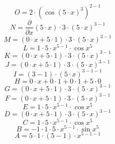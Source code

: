\documentclass[12pt]{article}
\begin{document}
\begin{equation}
	O = 
2\cdot \left( \cos {\left( 5\cdot x\right) ^{3}}\right) ^{2 - 1}
\end{equation}
\begin{equation}
	N = 
\frac{\partial}{\partial x}\left( 5\cdot x\right) \cdot 3\cdot \left( 5\cdot x\right) ^{3 - 1}
\end{equation}
\begin{equation}
	M = 
\left( 0\cdot x + 5\cdot 1\right) \cdot 3\cdot \left( 5\cdot x\right) ^{3 - 1}
\end{equation}
\begin{equation}
	L = 
1\cdot 5\cdot x^{5 - 1}\cdot \cos {x^{5}}
\end{equation}
\begin{equation}
	K = 
\left( 0\cdot x + 5\cdot 1\right) \cdot 3\cdot \left( 5\cdot x\right) ^{3 - 1}
\end{equation}
\begin{equation}
	J = 
\left( 0\cdot x + 5\cdot 1\right) \cdot 3\cdot \left( 5\cdot x\right) ^{3 - 1}
\end{equation}
\begin{equation}
	I = 
\left( 3 - 1\right) \cdot \left( 5\cdot x\right) ^{3 - 1 - 1}
\end{equation}
\begin{equation}
	H = 
0\cdot x + 0\cdot 1 + 0\cdot 1 + 5\cdot 0
\end{equation}
\begin{equation}
	G = 
\left( 0\cdot x + 5\cdot 1\right) \cdot 3\cdot \left( 5\cdot x\right) ^{3 - 1}
\end{equation}
\begin{equation}
	F = 
\left( 0\cdot x + 5\cdot 1\right) \cdot 3\cdot \left( 5\cdot x\right) ^{3 - 1}
\end{equation}
\begin{equation}
	E = 
1\cdot 5\cdot x^{5 - 1}\cdot \cos {x^{5}}
\end{equation}
\begin{equation}
	D = 
\left( 0\cdot x + 5\cdot 1\right) \cdot 3\cdot \left( 5\cdot x\right) ^{3 - 1}
\end{equation}
\begin{equation}
	C = 
1\cdot 5\cdot x^{5 - 1}\cdot \cos {x^{5}}
\end{equation}
\begin{equation}
	B = 
-1\cdot 1\cdot 5\cdot x^{5 - 1}\cdot \sin {x^{5}}
\end{equation}
\begin{equation}
	A = 
5\cdot 1\cdot \left( 5 - 1\right) \cdot x^{5 - 1 - 1}
\end{equation}
\end{document}
